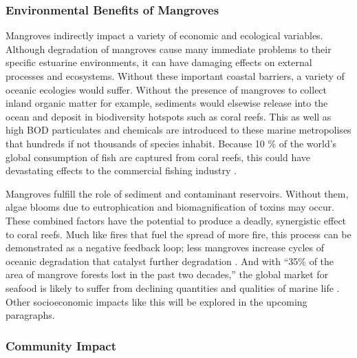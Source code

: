 \subsubsection{Environmental Benefits of Mangroves}
  Mangroves indirectly impact a variety of economic and ecological variables. Although degradation of mangroves cause many immediate problems to their specific estuarine environments, it can have damaging effects on external processes and ecosystems. Without these  important coastal barriers, a variety of oceanic ecologies would suffer. Without the presence of mangroves to collect inland organic matter for example, sediments would elsewise release into the ocean and deposit in biodiversity hotspots such as coral reefs. This as well as high BOD particulates and chemicals are introduced to these marine metropolises that hundreds if not thousands of species inhabit. Because 10 \% of the world's global consumption of fish are captured from coral reefs, this could have devastating effects to the commercial fishing industry \citep{naylor2000effect}. 

  Mangroves fulfill the role of sediment and contaminant reservoirs. Without them, algae blooms due to eutrophication and biomagnification of toxins may occur. These combined factors have the potential to produce a deadly, synergistic effect to coral reefs. Much like fires that fuel the spread of more fire, this process can be demonstrated as a negative feedback loop; less mangroves increase cycles of oceanic degradation that catalyst further degradation \citep{hoegh1999climate}. And with ``35\% of the area of mangrove forests lost in the past two decades,'' the global market for seafood is likely to suffer from declining quantities and qualities of marine life \citep{valiela2001mangrove}. Other socioeconomic impacts like this will be explored in the upcoming paragraphs.


\subsubsection{Community Impact}

